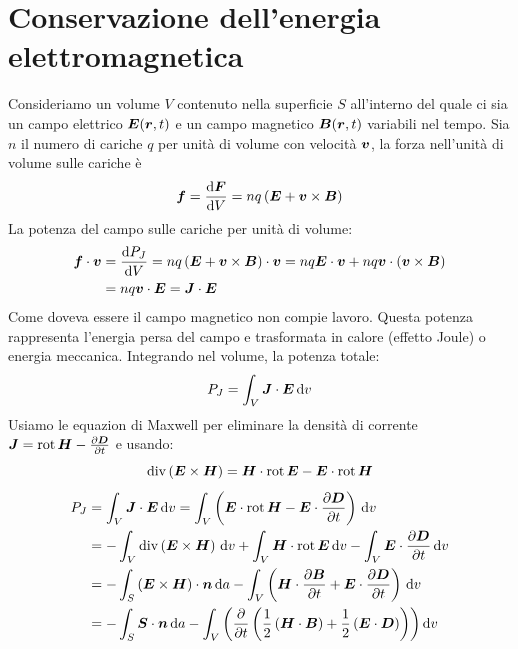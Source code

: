 \section{Conservazione dell'energia elettromagnetica}
Consideriamo un volume $V$ contenuto nella superficie $S$ all'interno del quale ci sia un campo elettrico $\boldsymbol{E}(\boldsymbol{r},t)$ e un campo magnetico $\boldsymbol{B}(\boldsymbol{r},t)$ variabili nel tempo. Sia $n$ il numero di cariche $q$ per unità di volume con velocità $\boldsymbol{v}$, la forza nell'unità di volume sulle cariche è
\begin{equation}
  \boldsymbol{f}=\frac{\mathrm{d}\boldsymbol{F}}{\mathrm{d} V}=nq\left(\boldsymbol{E}+\boldsymbol{v}\times\boldsymbol{B}\right)
\end{equation}
La potenza del campo sulle cariche per unità di volume:
\begin{equation}
  \begin{split}
    \boldsymbol{f}\cdot\boldsymbol{v}&=\frac{\mathrm{d} P_J}{\mathrm{d} V}=nq\left(\boldsymbol{E}+\boldsymbol{v}\times\boldsymbol{B}\right)\cdot\boldsymbol{v}=nq\boldsymbol{E}\cdot\boldsymbol{v}+nq\boldsymbol{v}\cdot\left(\boldsymbol{v}\times\boldsymbol{B}\right)\\
    &=nq\boldsymbol{v}\cdot\boldsymbol{E}=\boldsymbol{J}\cdot\boldsymbol{E}
  \end{split}
\end{equation}
Come doveva essere il campo magnetico non compie lavoro. Questa potenza rappresenta l'energia persa del campo e trasformata in calore (effetto Joule) o energia meccanica. Integrando nel volume, la potenza totale:
\begin{equation}
  P_J=\int_V\boldsymbol{J}\cdot\boldsymbol{E}\,\mathrm{d} v
\end{equation}
Usiamo le equazion di Maxwell per eliminare la densità di corrente $\boldsymbol{J}=\operatorname{rot}\boldsymbol{H}-\frac{\partial\boldsymbol{D}}{\partial t}$ e usando:
\[
  \operatorname{div}\left(\boldsymbol{E}\times\boldsymbol{H}\right)=\boldsymbol{H}\cdot\operatorname{rot}\boldsymbol{E}-\boldsymbol{E}\cdot\operatorname{rot}\boldsymbol{H}
\]
\begin{equation}
  \begin{split}
    P_J&=\int_V\boldsymbol{J}\cdot\boldsymbol{E}\,\mathrm{d} v=\int_V\left(\boldsymbol{E}\cdot\operatorname{rot}\boldsymbol{H}-\boldsymbol{E}\cdot\frac{\partial\boldsymbol{D}}{\partial t}\right)\,\mathrm{d} v\\
    &=-\int_V\operatorname{div}\left(\boldsymbol{E}\times\boldsymbol{H}\right)\,\mathrm{d} v+\int_V\boldsymbol{H}\cdot\operatorname{rot}\boldsymbol{E}\,\mathrm{d} v-\int_V\boldsymbol{E}\cdot\frac{\partial\boldsymbol{D}}{\partial t}\,\mathrm{d} v\\
    &=-\int_S\left(\boldsymbol{E}\times\boldsymbol{H}\right)\cdot\boldsymbol{n}\,\mathrm{d} a-\int_V\left(\boldsymbol{H}\cdot\frac{\partial\boldsymbol{B}}{\partial t}+\boldsymbol{E}\cdot\frac{\partial\boldsymbol{D}}{\partial t}\right)\,\mathrm{d} v\\
    &=-\int_S \boldsymbol{S}\cdot\boldsymbol{n}\,\mathrm{d} a-\int_V\left(\frac{\partial}{\partial t}\left(\frac{1}{2}\left(\boldsymbol{H}\cdot\boldsymbol{B}\right)+\frac{1}{2}\left(\boldsymbol{E}\cdot\boldsymbol{D}\right)\right)\right)\mathrm{d} v
  \end{split}
\end{equation}
